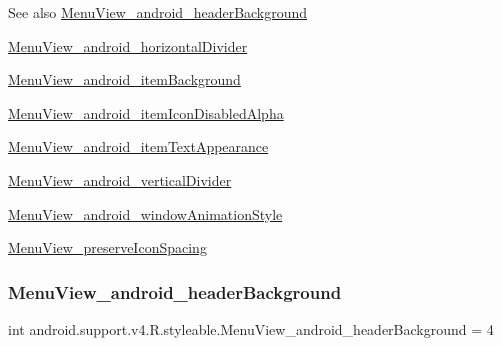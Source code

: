 \begin{DoxySeeAlso}{See also}
\hyperlink{classandroid_1_1support_1_1v4_1_1R_1_1styleable_a971cdc4ef5fe743adb7025a13b9f3da6}{Menu\+View\+\_\+android\+\_\+header\+Background} 

\hyperlink{classandroid_1_1support_1_1v4_1_1R_1_1styleable_a626e514babb4d9c7bbca39cdd99c10bf}{Menu\+View\+\_\+android\+\_\+horizontal\+Divider} 

\hyperlink{classandroid_1_1support_1_1v4_1_1R_1_1styleable_adda46f208eef1247d481e4c8ecc3c039}{Menu\+View\+\_\+android\+\_\+item\+Background} 

\hyperlink{classandroid_1_1support_1_1v4_1_1R_1_1styleable_aa9bab0281cd32b9892b27ae9cf5ee6e6}{Menu\+View\+\_\+android\+\_\+item\+Icon\+Disabled\+Alpha} 

\hyperlink{classandroid_1_1support_1_1v4_1_1R_1_1styleable_a421fdc72dee45bf4d8a3528c310da6f7}{Menu\+View\+\_\+android\+\_\+item\+Text\+Appearance} 

\hyperlink{classandroid_1_1support_1_1v4_1_1R_1_1styleable_af14763212ce7ca49cc48e32a6a0f5cd2}{Menu\+View\+\_\+android\+\_\+vertical\+Divider} 

\hyperlink{classandroid_1_1support_1_1v4_1_1R_1_1styleable_a69e7a03d136e8951fa5421ee2396b18b}{Menu\+View\+\_\+android\+\_\+window\+Animation\+Style} 

\hyperlink{classandroid_1_1support_1_1v4_1_1R_1_1styleable_a7d9ee3b9e735dd16f51e9c76f6dc4fc5}{Menu\+View\+\_\+preserve\+Icon\+Spacing} 
\end{DoxySeeAlso}
\mbox{\label{classandroid_1_1support_1_1v4_1_1R_1_1styleable_a971cdc4ef5fe743adb7025a13b9f3da6}} 
\subsubsection{\texorpdfstring{Menu\+View\+\_\+android\+\_\+header\+Background}{MenuView\_android\_headerBackground}}
{\footnotesize\ttfamily int android.\+support.\+v4.\+R.\+styleable.\+Menu\+View\+\_\+android\+\_\+header\+Background = 4\hspace{0.3cm}{\ttfamily [static]}}

